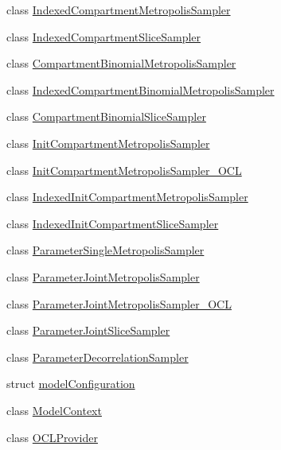 \begin{DoxyCompactItemize}
\item 
class \hyperlink{classSpatialSEIR_1_1IndexedCompartmentMetropolisSampler}{Indexed\-Compartment\-Metropolis\-Sampler}
\item 
class \hyperlink{classSpatialSEIR_1_1IndexedCompartmentSliceSampler}{Indexed\-Compartment\-Slice\-Sampler}
\item 
class \hyperlink{classSpatialSEIR_1_1CompartmentBinomialMetropolisSampler}{Compartment\-Binomial\-Metropolis\-Sampler}
\item 
class \hyperlink{classSpatialSEIR_1_1IndexedCompartmentBinomialMetropolisSampler}{Indexed\-Compartment\-Binomial\-Metropolis\-Sampler}
\item 
class \hyperlink{classSpatialSEIR_1_1CompartmentBinomialSliceSampler}{Compartment\-Binomial\-Slice\-Sampler}
\item 
class \hyperlink{classSpatialSEIR_1_1InitCompartmentMetropolisSampler}{Init\-Compartment\-Metropolis\-Sampler}
\item 
class \hyperlink{classSpatialSEIR_1_1InitCompartmentMetropolisSampler__OCL}{Init\-Compartment\-Metropolis\-Sampler\-\_\-\-O\-C\-L}
\item 
class \hyperlink{classSpatialSEIR_1_1IndexedInitCompartmentMetropolisSampler}{Indexed\-Init\-Compartment\-Metropolis\-Sampler}
\item 
class \hyperlink{classSpatialSEIR_1_1IndexedInitCompartmentSliceSampler}{Indexed\-Init\-Compartment\-Slice\-Sampler}
\item 
class \hyperlink{classSpatialSEIR_1_1ParameterSingleMetropolisSampler}{Parameter\-Single\-Metropolis\-Sampler}
\item 
class \hyperlink{classSpatialSEIR_1_1ParameterJointMetropolisSampler}{Parameter\-Joint\-Metropolis\-Sampler}
\item 
class \hyperlink{classSpatialSEIR_1_1ParameterJointMetropolisSampler__OCL}{Parameter\-Joint\-Metropolis\-Sampler\-\_\-\-O\-C\-L}
\item 
class \hyperlink{classSpatialSEIR_1_1ParameterJointSliceSampler}{Parameter\-Joint\-Slice\-Sampler}
\item 
class \hyperlink{classSpatialSEIR_1_1ParameterDecorrelationSampler}{Parameter\-Decorrelation\-Sampler}
\item 
struct \hyperlink{structSpatialSEIR_1_1modelConfiguration}{model\-Configuration}
\item 
class \hyperlink{classSpatialSEIR_1_1ModelContext}{Model\-Context}
\item 
class \hyperlink{classSpatialSEIR_1_1OCLProvider}{O\-C\-L\-Provider}

\end{DoxyCompactItemize}
